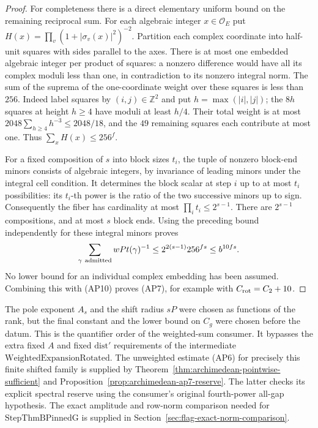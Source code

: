 \begin{proof}
For completeness there is a direct elementary
uniform bound on the remaining reciprocal sum.
For each algebraic integer \(x\in\mathcal O_E\)
put \(H(x)=\prod_v(1+|\sigma_v(x)|^2)^{-2}\).
Partition each complex coordinate into half-unit
squares with sides parallel to the axes. There
is at most one embedded algebraic integer per
product of squares: a nonzero difference would
have all its complex moduli less than one, in
contradiction to its nonzero integral norm.
The sum of the suprema of the one-coordinate
weight over these squares is less than \(256\).
Indeed label squares by \((i,j)\in\mathbb Z^2\)
and put \(h=\max(|i|,|j|)\); the \(8h\) squares
at height \(h\ge4\) have moduli at least \(h/4\).
Their total weight is at most
\(2048\sum_{h\ge4}h^{-3}\le2048/18\), and the
\(49\) remaining squares each contribute at most
one. Thus \(\sum_x H(x)\le256^f\).

For a fixed composition of \(s\) into block
sizes \(t_i\), the tuple of nonzero block-end
minors consists of algebraic integers, by
invariance of leading minors under the integral
cell condition. It determines the block scalar
at step \(i\) up to at most \(t_i\) possibilities:
its \(t_i\)-th power is the ratio of the two
successive minors up to sign. Consequently the
fiber has cardinality at most
\(\prod_i t_i\le2^{s-1}\). There are \(2^{s-1}\)
compositions, and at most \(s\) block ends.
Using the preceding bound independently for
these integral minors proves
\[
        \sum_{\gamma\ {\rm admitted}}wPt(\gamma)^{-1}
                 \le2^{2(s-1)}256^{fs}
                 \le b^{10fs}.
\]
No lower bound for an individual complex embedding
has been assumed. Combining this with (AP10)
proves (AP7), for example with
\(C_{\rm rot}=C_2+10\).
\end{proof}

The pole exponent \(A_s\) and the shift radius \(sP\)
were chosen as functions of the rank, but the final
constant and the lower bound on \(C_g\) were chosen
before the datum. This is the quantifier order of the
weighted-sum consumer. It bypasses the extra fixed
\(A\) and fixed \(\mathrm{dist}'\) requirements of the
intermediate \(\mathrm{WeightedExpansionRotated}\).
The unweighted estimate (AP6) for precisely this finite shifted
family is supplied by
Theorem~\ref{thm:archimedean-pointwise-sufficient} and
Proposition~\ref{prop:archimedean-ap7-reserve}. The latter
checks its explicit spectral reserve using the consumer's
original fourth-power all-gap hypothesis. The exact amplitude
and row-norm comparison needed for
\(\mathrm{StepThmBPinnedG}\) is supplied in
Section~\ref{sec:flag-exact-norm-comparison}.
